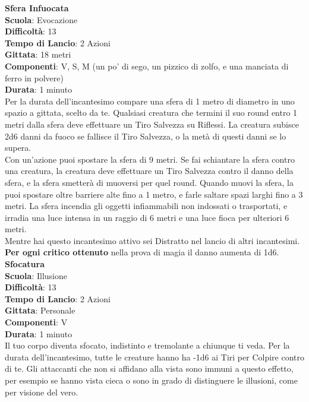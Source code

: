 \begin{multicols}{2}
\medskip\textbf{Sfera Infuocata}\\
\textbf{Scuola}: Evocazione\\
\textbf{Difficoltà}:  13\\
\textbf{Tempo di Lancio}: 2 Azioni\\
\textbf{Gittata}: 18 metri\\
\textbf{Componenti}: V, S, M (un po’ di sego, un pizzico di zolfo, e una manciata di ferro in polvere)\\
\textbf{Durata}: 1 minuto\\
Per la durata dell'incantesimo compare una sfera di 1 metro  di diametro in uno spazio a gittata, scelto da te. Qualsiasi creatura che termini il suo round entro 1 metri dalla sfera deve effettuare un Tiro Salvezza su Riflessi. La creatura subisce 2d6 danni da fuoco se fallisce il Tiro Salvezza, o la metà di questi danni se lo supera.\\
Con un'azione puoi spostare la sfera di 9 metri. Se fai schiantare la sfera contro una creatura, la creatura deve effettuare un Tiro Salvezza contro il danno della sfera, e la sfera smetterà di muoversi per quel round.
Quando muovi la sfera, la puoi spostare oltre barriere alte fino a 1 metro, e farle saltare spazi larghi fino a 3 metri. La sfera incendia gli oggetti infiammabili non indossati o trasportati, e irradia una luce intensa in un  raggio di 6 metri e una luce fioca per ulteriori 6 metri.\\
Mentre hai questo incantesimo attivo sei Distratto nel lancio di altri incantesimi.\\
\textbf{Per ogni critico ottenuto} nella prova di magia il danno aumenta di 1d6.\\

\medskip\textbf{Sfocatura}\\
\textbf{Scuola}: Illusione\\
\textbf{Difficoltà}:  13\\
\textbf{Tempo di Lancio}: 2 Azioni\\
\textbf{Gittata}: Personale\\
\textbf{Componenti}: V\\
\textbf{Durata}: 1 minuto \\
Il tuo corpo diventa sfocato, indistinto e tremolante a chiunque ti veda. Per la durata dell'incantesimo, tutte le creature hanno ha -1d6 ai Tiri per Colpire contro di te. Gli attaccanti che non si affidano alla vista sono immuni a questo effetto, per esempio se hanno vista cieca o sono in grado di distinguere le illusioni, come per visione del vero.


\end{multicols}
